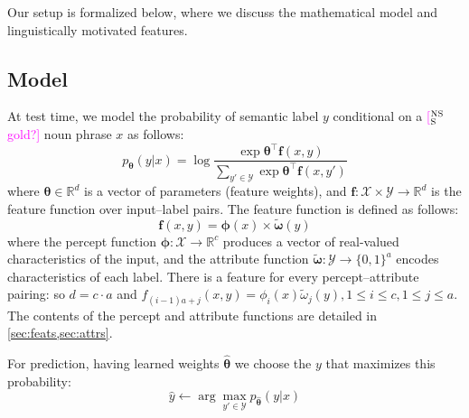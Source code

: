 \documentclass[11pt,letterpaper]{article}
\newcommand{\ensuretext}[1]{#1}
\newcommand{\nssmarker}{\ensuretext{\textcolor{magenta}{\ensuremath{^{\textsc{NS}}_{\textsc{S}}}}}}
\newcommand{\arkcomment}[3]{\ensuretext{\textcolor{#3}{[#1 #2]}}}
\newcommand{\nss}[1]{\arkcomment{\nssmarker}{#1}{magenta}}
\begin{document}
Our setup is formalized below, where we discuss the mathematical model and linguistically motivated features.

\subsection{Model}

At test time, we model the probability of semantic label $y$ 
conditional on a \nss{gold?} noun phrase $x$ as follows:
\begin{equation}
p_{\boldsymbol{\theta}}(y | x) = \log{\frac{\exp{\boldsymbol{\theta}^{\top}\mathbf{f}(x,y)}}{\sum_{y' \in \mathcal{Y}}\exp{\boldsymbol{\theta}^{\top}\mathbf{f}(x,y')}}}
\end{equation}
where $\boldsymbol{\theta} \in \mathbb{R}^d$ is a vector of parameters (feature weights), and 
$\mathbf{f}: \mathcal{X} \times \mathcal{Y} \rightarrow \mathbb{R}^d$ is the feature function over input--label pairs.
The feature function is defined as follows:
\begin{equation}
\mathbf{f}(x,y) = \boldsymbol{\phi}(x) \times \tilde{\boldsymbol{\omega}}(y)
\end{equation}
where the percept function $\boldsymbol{\phi}: \mathcal{X} \rightarrow \mathbb{R}^c$ 
produces a vector of real-valued characteristics of the input, and  
the attribute function $\tilde{\boldsymbol{\omega}}: \mathcal{Y} \rightarrow \{0,1\}^a$
encodes characteristics of each label.
There is a feature for every percept--attribute pairing: so
$d = c \cdot a$ and $f_{(i-1)a+j}(x,y) = \phi_i(x)\tilde{\omega}_j(y), 1 \leq i \leq c, 1 \leq j \leq a$.
The contents of the percept and attribute functions are detailed in \cref{sec:feats,sec:attrs}.

For prediction, having learned weights $\hat{\boldsymbol{\theta}}$ we choose the $y$ that maximizes this probability:
\begin{equation}
\hat{y} \leftarrow \arg\max_{y' \in \mathcal{Y}} p_{\hat{\boldsymbol{\theta}}}(y | x)
\end{equation}
\end{document}
